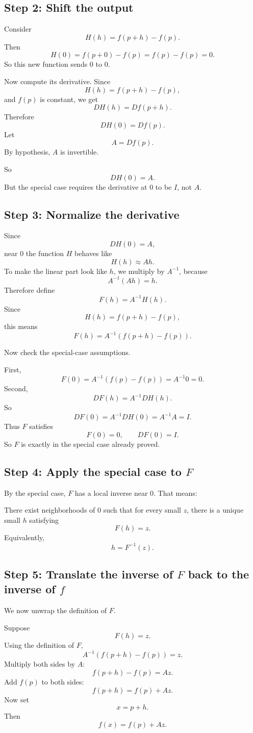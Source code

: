 \documentclass[11pt]{article}
\begin{document}
\subsection*{Step 2: Shift the output}

Consider
\[
H(h)=f(p+h)-f(p).
\]
Then
\[
H(0)=f(p+0)-f(p)=f(p)-f(p)=0.
\]
So this new function sends $0$ to $0$.

Now compute its derivative. Since
\[
H(h)=f(p+h)-f(p),
\]
and $f(p)$ is constant, we get
\[
DH(h)=Df(p+h).
\]
Therefore
\[
DH(0)=Df(p).
\]
Let
\[
A=Df(p).
\]
By hypothesis, $A$ is invertible.

So
\[
DH(0)=A.
\]
But the special case requires the derivative at $0$ to be $I$, not $A$.

\subsection*{Step 3: Normalize the derivative}

Since
\[
DH(0)=A,
\]
near $0$ the function $H$ behaves like
\[
H(h)\approx Ah.
\]
To make the linear part look like $h$, we multiply by $A^{-1}$, because
\[
A^{-1}(Ah)=h.
\]
Therefore define
\[
F(h)=A^{-1}H(h).
\]
Since
\[
H(h)=f(p+h)-f(p),
\]
this means
\[
F(h)=A^{-1}(f(p+h)-f(p)).
\]

Now check the special-case assumptions.

First,
\[
F(0)=A^{-1}(f(p)-f(p))=A^{-1}0=0.
\]
Second,
\[
DF(h)=A^{-1}DH(h).
\]
So
\[
DF(0)=A^{-1}DH(0)=A^{-1}A=I.
\]
Thus $F$ satisfies
\[
F(0)=0,
\qquad
DF(0)=I.
\]
So $F$ is exactly in the special case already proved.

\subsection*{Step 4: Apply the special case to $F$}

By the special case, $F$ has a local inverse near $0$. That means:

There exist neighborhoods of $0$ such that for every small $z$, there is a unique small $h$ satisfying
\[
F(h)=z.
\]
Equivalently,
\[
h=F^{-1}(z).
\]

\subsection*{Step 5: Translate the inverse of $F$ back to the inverse of $f$}

We now unwrap the definition of $F$.

Suppose
\[
F(h)=z.
\]
Using the definition of $F$,
\[
A^{-1}(f(p+h)-f(p))=z.
\]
Multiply both sides by $A$:
\[
f(p+h)-f(p)=Az.
\]
Add $f(p)$ to both sides:
\[
f(p+h)=f(p)+Az.
\]
Now set
\[
x=p+h.
\]
Then
\[
f(x)=f(p)+Az.
\]
\end{document}
